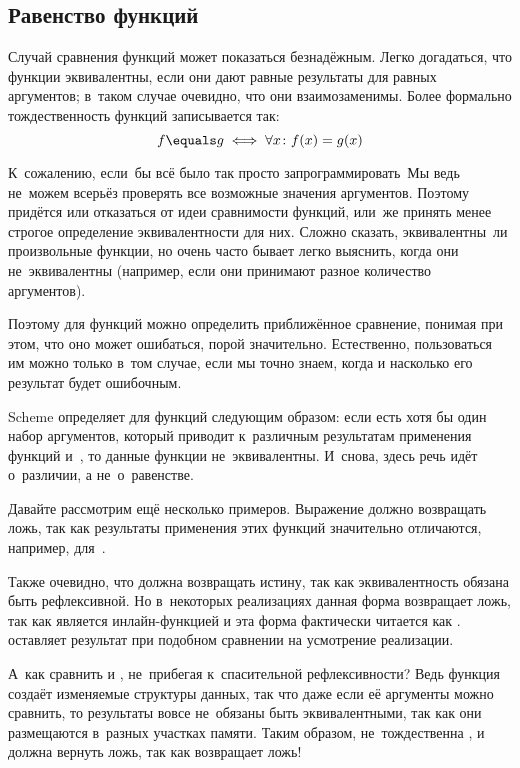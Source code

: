 \subsection{Равенство функций}%
\label{assignment/side-effects/ssect:equality-func}

Случай сравнения функций может показаться безнадёжным. Легко догадаться, что
функции эквивалентны, если они дают равные результаты для равных аргументов;
в~таком случае очевидно, что они взаимозаменимы. Более формально
тождественность функций записывается так:
%
\[ f \equals g \iff \forall x \colon f(x) = g(x) \]

К~сожалению, если~бы всё было так просто запрограммировать\textdots\ Мы ведь
не~можем всерьёз проверять все возможные значения аргументов. Поэтому придётся
или отказаться от идеи сравнимости функций, или~же принять менее строгое
определение эквивалентности для них. Сложно сказать, эквивалентны~ли
произвольные функции, но очень часто бывает легко выяснить, когда они
не~эквивалентны (например, если они принимают разное количество аргументов).

Поэтому для функций можно определить приближённое сравнение, понимая при этом,
что оно может ошибаться, порой значительно. Естественно, пользоваться им можно
только в~том случае, если мы точно знаем, когда и насколько его результат будет
ошибочным.

Scheme определяет  для функций следующим образом: если есть хотя бы
один набор аргументов, который приводит к~различным результатам применения
функций  и~, то данные функции не~эквивалентны. И~снова, здесь речь
идёт о~различии, а не~о~равенстве.

Давайте рассмотрим ещё несколько примеров. Выражение  должно
возвращать ложь, так как результаты применения этих функций значительно
отличаются, например, для~.

Также очевидно, что  должна возвращать истину, так как
эквивалентность обязана быть рефлексивной. Но в~некоторых реализациях данная
форма возвращает ложь, так как  является инлайн-функцией и эта форма
фактически читается как .
{\RnRS} оставляет результат  при подобном сравнении на усмотрение
реализации.

А~как сравнить  и , не~прибегая к~спасительной рефлексивности?
Ведь функция~ создаёт изменяемые структуры данных, так что даже если её
аргументы можно сравнить, то результаты вовсе не~обязаны быть эквивалентными,
так как они размещаются в~разных участках памяти. Таким образом, 
не~тождественна , и  должна вернуть ложь, так как
 возвращает ложь!

